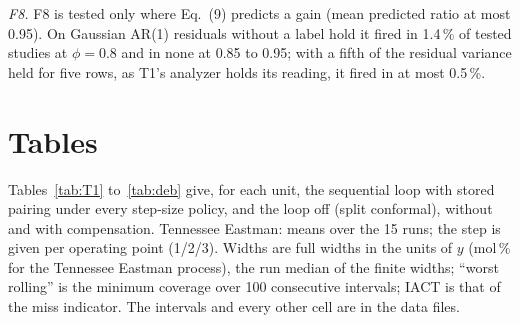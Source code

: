 \documentclass[10pt,a4paper]{article}
\newcommand{\figdir}{../../IPIS/docs/paper/figures/n1}
\begin{document}
\emph{F8.} F8 is tested only where Eq.~(9) predicts a gain (mean predicted ratio at most 0.95).
On Gaussian AR(1) residuals without a label hold it fired in 1.4\,\% of tested studies at
$\phi = 0.8$ and in none at 0.85 to 0.95; with a fifth of the residual variance held for five rows,
as T1's analyzer holds its reading, it fired in at most 0.5\,\%.

\section{Tables}

Tables~\ref{tab:T1} to~\ref{tab:deb} give, for each unit, the sequential loop with stored pairing
under every step-size policy, and the loop off (split conformal), without and with compensation.
Tennessee Eastman: means over the 15 runs; the step is given per operating point (1/2/3). Widths
are full widths in the units of $y$ (mol\,\% for the Tennessee Eastman process), the run median of
the finite widths; ``worst rolling'' is the minimum coverage over 100 consecutive intervals; IACT
is that of the miss indicator. The intervals and every other cell are in the data files.

\begin{table}[p]
\centering\footnotesize
\caption{T1 (3-min updates; ridge regression): every policy of the sequential loop.}
\label{tab:T1}

\end{table}

\begin{table}[p]
\centering\footnotesize
\caption{T1\_gb (3-min updates; gradient boosting): every policy of the sequential loop.}
\label{tab:T1gb}

\end{table}

\begin{table}[p]
\centering\footnotesize
\caption{T2 (1-min updates; ridge regression): every policy of the sequential loop.}
\label{tab:T2}

\end{table}

\begin{table}[p]
\centering\footnotesize
\caption{T3 (one update per analyzer value; window of 40 labels; descriptive): every policy of
the sequential loop.}
\label{tab:T3}

\end{table}

\begin{table}[p]
\centering\footnotesize
\caption{Debutanizer (one stream, 719 evaluation rows): every policy of the sequential loop. The
step is the single tuned value.}
\label{tab:deb}

\end{table}
\end{document}
